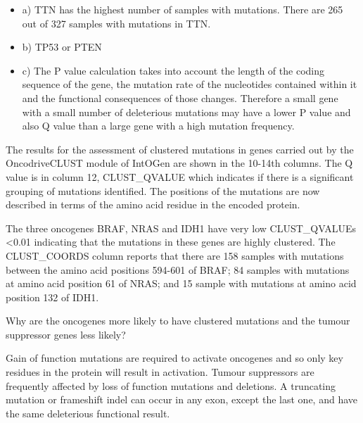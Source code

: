 \begin{answer}
\begin{itemize}
\item a) TTN has the highest number of samples with mutations. There are 265 out of 327
samples with mutations in TTN.
\item b) TP53 or PTEN
\item c) The P value calculation takes into account the length of the coding sequence
of the gene, the mutation rate of the nucleotides contained within it and the functional
consequences of those changes. Therefore a small gene with a small number of deleterious
mutations may have a lower P value and also Q value than a large gene with a high
mutation frequency.
\end{itemize}
\end{answer}

\begin{information}
The results for the assessment of clustered mutations in genes carried out by the
OncodriveCLUST module of IntOGen are shown in the 10-14th columns. The Q value is in
column 12, CLUST\_QVALUE which indicates if there is a significant grouping of mutations
identified. The positions of the mutations are now described in terms of the amino acid
residue in the encoded protein.
\end{information}

The three oncogenes BRAF, NRAS and IDH1 have very low CLUST\_QVALUEs <0.01 indicating
that the mutations in these genes are highly clustered. The CLUST\_COORDS column reports
that there are 158 samples with mutations between the amino acid positions 594-601 of
BRAF; 84 samples with mutations at amino acid position 61 of NRAS; and 15 sample with
mutations at amino acid position 132 of IDH1.

\begin{questions} 
Why are the oncogenes more likely to have clustered mutations and the tumour suppressor genes less likely?
\end{questions}

\begin{answer}
Gain of function mutations are required to activate oncogenes and so only key residues in the protein
will result in activation. Tumour suppressors are frequently affected by loss of function mutations
and deletions. A truncating mutation or frameshift indel can occur in any exon, except the last one,
and have the same deleterious functional result.
\end{answer}

